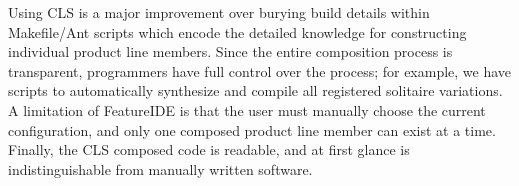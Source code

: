  Using CLS is a major improvement over burying build details within Makefile/Ant scripts which encode the detailed
 knowledge for constructing individual product line members. Since the entire composition process is transparent,
 programmers have full control over the process; for example, we have scripts to automatically synthesize and
 compile all registered solitaire variations.
 A limitation of FeatureIDE is that the user must manually choose the current configuration, and only one composed
 product line member can exist at a time. Finally, the CLS composed code is readable, and at first glance is
 indistinguishable from manually written software.